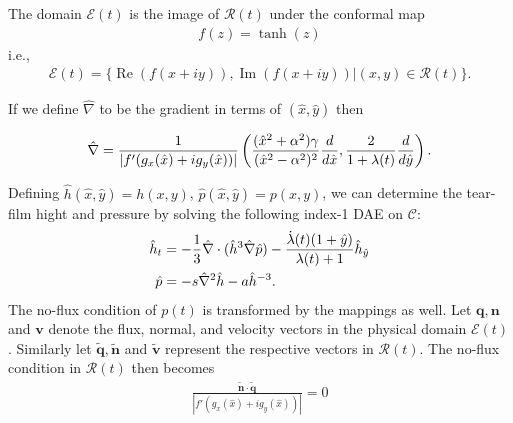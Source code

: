 The domain $\mathcal{E}(t)$ is the image of $\mathcal{R}(t)$ under the conformal map
\begin{align}
f(z) = \tanh(z)	
\end{align}
i.e.,
\begin{align}
\mathcal{E}(t) = \{\operatorname{Re}(f(x+iy)),\operatorname{Im}(f(x+iy))|(x,y) \in \mathcal{R}(t)  \}.
\end{align}

If we define $\hat{\nabla}$ to be the gradient in terms of $(\hat{x},\hat{y})$ then

\begin{align}
\hat{\nabla} = \frac{1}{|f'(g_x(\hat{x})+i g_y(\hat{x}))|} \left( \frac{(\hat{x}^2+\alpha^2)\gamma}{(\hat{x}^2-\alpha^2)^2} \frac{d}{d \hat{x}}, \frac{2}{1+\lambda(t)} \frac{d}{d \hat{y}} \right).
\end{align}

Defining $\hat{h}(\hat{x},\hat{y})=h(x,y)$, $\hat{p}(\hat{x},\hat{y})=p(x,y)$, we can determine the tear-film hight and pressure by solving the following index-1 DAE on $\mathcal{C}$:
\begin{align}
\begin{aligned}
\hat{h}_t &= -\frac{1}{3} \hat{\nabla} \cdot (\hat{h}^3 \hat{\nabla} \hat{p}) -\frac{\dot{\lambda}(t)(1+\hat{y})}{\lambda(t)+1} \hat{h}_{\hat{y}} \\
\hat{p} &= - s \hat{\nabla}^2 \hat{h} - a \hat{h}^{-3}.
\end{aligned}
\end{align}
The no-flux condition of $p(t)$ is transformed by the mappings as well. Let $\bm{q},\bm{n}$ and $\bm{v}$ denote the flux, normal, and velocity vectors in the physical domain $\mathcal{E}(t)$. Similarly let $\bm{\tilde{q}},\bm{\tilde{n}}$ and $\bm{\tilde{v}}$ represent the respective vectors in $\mathcal{R}(t)$. The no-flux condition in $\mathcal{R}(t)$ then becomes
\begin{align}
	 \frac{\bm{\tilde{n}} \cdot \bm{\tilde{q}}}{|f'(g_x(\hat{x})+i g_y(\hat{x}))|} = 0
\end{align}





